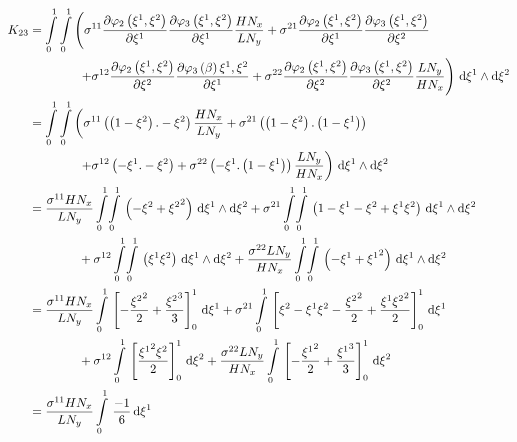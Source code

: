 \begin{equation}
  \begin{aligned}
    K_{23}&=\dintl{0}{1}\dintl{0}{1}\left(
    \conductivitytensorsymbol^{11}\delby{\lbfn{2}{\xione,\xitwo}}{\xione}
    \delby{\lbfn{3}{\xione,\xitwo}}{\xione}\dfrac{H N_{x}}{L N_{y}}+
    \conductivitytensorsymbol^{21}\delby{\lbfn{2}{\xione,\xitwo}}{\xione}
    \delby{\lbfn{3}{\xione,\xitwo}}{\xitwo}\right.\\
    &\qquad\qquad\left.+\conductivitytensorsymbol^{12}\delby{\lbfn{2}{\xione,\xitwo}}{\xitwo}
    \delby{\lbfn{3}{\beta}{\xione,\xitwo}}{\xione}+
    \conductivitytensorsymbol^{22}\delby{\lbfn{2}{\xione,\xitwo}}{\xitwo}
    \delby{\lbfn{3}{\xione,\xitwo}}{\xitwo}\dfrac{L N_{y}}{H N_{x}}\right)\infinitesimaltwo{\xione}{\xitwo}\\
    &=\dintl{0}{1}\dintl{0}{1}\left(
    \conductivitytensorsymbol^{11}\pbrac{\pbrac{1-\xitwo}.-\xitwo}\dfrac{H N_{x}}{L N_{y}}+
    \conductivitytensorsymbol^{21}\pbrac{\pbrac{1-\xitwo}.\pbrac{1-\xione}}\right.\\
    &\qquad\qquad\left.+\conductivitytensorsymbol^{12}\pbrac{-\xione.-\xitwo}+
    \conductivitytensorsymbol^{22}\pbrac{-\xione.\pbrac{1-\xione}}\dfrac{L N_{y}}{H N_{x}}\right)
    \infinitesimaltwo{\xione}{\xitwo}\\
    &=\dfrac{\conductivitytensorsymbol^{11} H N_{x}}{L N_{y}}\giint{0}{1}{0}{1}{\pbrac{-\xitwo+\xitwosq}}{\xione}{\xitwo}
    +\conductivitytensorsymbol^{21}\giint{0}{1}{0}{1}{\pbrac{1-\xione-\xitwo+\xione\xitwo}}{\xione}{\xitwo}\\
    &\qquad\qquad+\conductivitytensorsymbol^{12}\giint{0}{1}{0}{1}{\pbrac{\xione\xitwo}}{\xione}{\xitwo}
    +\dfrac{\conductivitytensorsymbol^{22} L N_{y}}{H N_{x}}\giint{0}{1}{0}{1}{\pbrac{-\xione+\xionesq}}{\xione}{\xitwo} \\
    &=\dfrac{\conductivitytensorsymbol^{11} H N_{x}}{L N_{y}}\gint{0}{1}{\sqbrac{-\dfrac{\xitwosq}{2}+\dfrac{\xitwocube}{3}}^{1}_{0}}{\xione}
    +\conductivitytensorsymbol^{21}\gint{0}{1}{\sqbrac{\xitwo-\xione\xitwo-\dfrac{\xitwosq}{2}+\dfrac{\xione\xitwosq}{2}}^{1}_{0}}{\xione}\\
    &\qquad\qquad+\conductivitytensorsymbol^{12}\gint{0}{1}{\sqbrac{\dfrac{\xionesq\xitwo}{2}}^{1}_{0}}{\xitwo}
    +\dfrac{\conductivitytensorsymbol^{22} L N_{y}}{H N_{x}}\gint{0}{1}{\sqbrac{-\dfrac{\xionesq}{2}+\dfrac{\xionecube}{3}}^{1}_{0}}{\xitwo} \\
    &=\dfrac{\conductivitytensorsymbol^{11} H N_{x}}{L N_{y}}\gint{0}{1}{\dfrac{-1}{6}}{\xione}

\end{aligned}
\end{equation}
